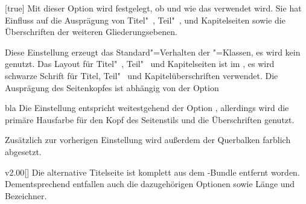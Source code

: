 \documentclass[english,ngerman,ToDo=no]{tudscrman3}
\begin{document}
\begin{Declaration}[%
  v2.01!\Option{cd=bla};
  v2.02!\Option{cd=\PValueName{blubb}}:hallo
]{}[true]
\printdeclarationlist%
%
Mit dieser Option wird festgelegt, ob und wie das \TUDCD verwendet wird. Sie 
hat Einfluss auf die Ausprägung von Titel"~, Teil"~, und Kapitelseiten sowie 
die Überschriften der weiteren Gliederungsebenen.

\begin{values}{}
\itemfalse
  Diese Einstellung erzeugt das Standard"=Verhalten der \KOMAScript"=Klassen, 
  es wird kein \CD genutzt.
  Das Layout für Titel"~, Teil"~ und Kapitelseiten ist im \CD, es wird 
  schwarze Schrift für Titel, Teil"~ und Kapitelüberschriften verwendet. Die 
  Ausprägung des Seitenkopfes ist abhängig von der Option
\item[bla]
  Die Einstellung entspricht weitestgehend der Option , 
  allerdings wird die primäre Hausfarbe  für den Kopf des 
  Seitenstils und die Überschriften genutzt.
\item[\PValueName{blubb}]
   Zusätzlich zur vorherigen Einstellung wird außerdem der 
  Querbalken farblich abgesetzt.
\end{values}
%
\end{Declaration}

\clearpage

\begin{Obsolete}{v2.00}[]{}
\printobsoletelist%
%
Die alternative Titelseite ist komplett aus dem \TUDScript-Bundle entfernt 
worden. Dementsprechend entfallen auch die dazugehörigen Optionen sowie Länge 
und Bezeichner.
\end{Obsolete}

\clearpage
\makeatletter
\@printindex[options]
\@printindex[macros]
\PrintChangelog
\end{document}
